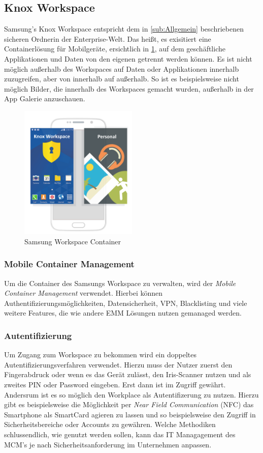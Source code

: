 \subsection{Knox Workspace}
Samsung's Knox Workspace entspricht dem in \cref{sub:Allgemein} beschriebenen \flqq sicheren Ordner\frqq in der Enterprise-Welt. Das heißt, es exisitiert eine Containerlösung für Mobilgeräte, ersichtlich in \cref{fig:SamKno2}, auf dem geschäftliche Applikationen und Daten von den eigenen getrennt werden können. Es ist nicht möglich außerhalb des Workspaces auf Daten oder Applikationen innerhalb zuzugreifen, aber von innerhalb auf außerhalb. So ist es beispielsweise nicht möglich Bilder, die innerhalb des Workspaces gemacht wurden, außerhalb in der App Galerie anzuschauen.
\begin{figure}[hbt]
\centering
\includegraphics[width=0.5\textwidth]{Bilder/sk_2}
\caption{Samsung Workspace Container}\label{fig:SamKno2}
\end{figure}

\subsubsection{Mobile Container Management}
Um die Container des Samsungs Workspace zu verwalten, wird der \textit{Mobile Container Management} verwendet. Hierbei können Authentifizierungsmöglichkeiten, Datensicherheit,  VPN, Blacklisting und viele weitere Features, die wie andere EMM Lösungen nutzen gemanaged werden.

\subsubsection{Autentifizierung}
Um Zugang zum Workspace zu bekommen wird ein doppeltes Autentifizierungsverfahren verwendet. Hierzu muss der Nutzer zuerst den Fingerabdruck oder wenn es das Gerät zulässt, den Iris-Scanner nutzen und als zweites PIN oder Password eingeben. Erst dann ist im Zugriff gewährt.
Andersrum ist es so möglich den Workplace als Autentifizerung zu nutzen. Hierzu gibt es beispielsweise die Möglichkeit per \textit{Near Field Communication} (NFC) das Smartphone als SmartCard agieren zu lassen und so beispielsweise den Zugriff in Sicherheitsbereiche oder Accounts zu gewähren.
Welche Methodiken schlussendlich, wie genutzt werden sollen, kann das IT Managagement des MCM's je nach Sicherheitsanforderung im Unternehmen anpassen.

